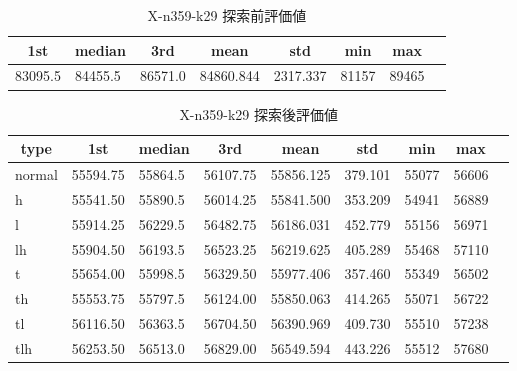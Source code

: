 \begin{table}[htbp]
    \caption{X-n359-k29 探索前評価値}
    \begin{tabular}{|l|l|l|l|l|l|l|l|}\hline
    \multicolumn{1}{|c|}{\textbf{1st}}
    &\multicolumn{1}{c|}{\textbf{median}}
    &\multicolumn{1}{c|}{\textbf{3rd}}
    &\multicolumn{1}{c|}{\textbf{mean}}
    &\multicolumn{1}{c|}{\textbf{std}}
    &\multicolumn{1}{c|}{\textbf{min}}
    &\multicolumn{1}{c|}{\textbf{max}}\\\hline
	83095.5 & 84455.5 & 86571.0 & 84860.844 & 2317.337 & 81157 & 89465\\\hline
	\end{tabular}
\end{table}
\begin{table}[htbp]
    \caption{X-n359-k29 探索後評価値}
    \begin{tabular}{|l|l|l|l|l|l|l|l|l|}\hline
    \multicolumn{1}{|c|}{\textbf{type}}
    &\multicolumn{1}{|c|}{\textbf{1st}}
    &\multicolumn{1}{c|}{\textbf{median}}
    &\multicolumn{1}{c|}{\textbf{3rd}}
    &\multicolumn{1}{c|}{\textbf{mean}}
    &\multicolumn{1}{c|}{\textbf{std}}
    &\multicolumn{1}{c|}{\textbf{min}}
    &\multicolumn{1}{c|}{\textbf{max}}\\\hline
	normal & 55594.75 & 55864.5 & 56107.75 & 55856.125 & 379.101 & 55077 & 56606\\\hline
	h & 55541.50 & 55890.5 & 56014.25 & 55841.500 & 353.209 & 54941 & 56889\\\hline
	l & 55914.25 & 56229.5 & 56482.75 & 56186.031 & 452.779 & 55156 & 56971\\\hline
	lh & 55904.50 & 56193.5 & 56523.25 & 56219.625 & 405.289 & 55468 & 57110\\\hline
	t & 55654.00 & 55998.5 & 56329.50 & 55977.406 & 357.460 & 55349 & 56502\\\hline
	th & 55553.75 & 55797.5 & 56124.00 & 55850.063 & 414.265 & 55071 & 56722\\\hline
	tl & 56116.50 & 56363.5 & 56704.50 & 56390.969 & 409.730 & 55510 & 57238\\\hline
	tlh & 56253.50 & 56513.0 & 56829.00 & 56549.594 & 443.226 & 55512 & 57680\\\hline
	\end{tabular}
\end{table}
